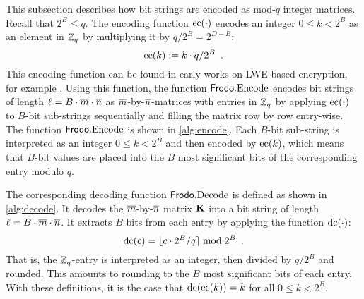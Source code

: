 This subsection describes how bit strings are encoded as mod-$q$ integer matrices.
Recall that $2^B \leq q$. The encoding function $\textrm{\upshape\mdseries ec}(\cdot)$ encodes an integer $0 \leq k < 2^B$ as an element in $\mathbb{Z}_q$ by multiplying it by $q/2^B=2^{D-B}$:
\[ \textrm{\upshape\mdseries ec}(k) := k\cdot  q/2^B \enspace . \]
This encoding function can be found in early works on LWE-based encryption, for example \cite{PKC:KawTanXag07,STOC:PeiWat08,C:PeiVaiWat08}.
Using this function, the function $\textsf{\upshape\mdseries Frodo}.\textrm{\upshape\mdseries Encode}$ encodes bit strings of
length $\ell=B\cdot \overline{m}\cdot\overline{n}$ as  $\overline{m}$-by-$\overline{n}$-matrices with
entries in $\mathbb{Z}_q$ by applying $\textrm{\upshape\mdseries ec}(\cdot)$ to $B$-bit sub-strings sequentially and filling the matrix row by row entry-wise. The function $\textsf{\upshape\mdseries Frodo}.\textrm{\upshape\mdseries Encode}$ is shown in \autoref{alg:encode}.
Each $B$-bit sub-string is interpreted as an integer $0 \leq k < 2^B$ and then encoded by $\textrm{\upshape\mdseries ec}(k)$, which means that $B$-bit values are placed into the $B$ most significant bits of the corresponding entry modulo $q$.  

The corresponding decoding function $\textsf{\upshape\mdseries Frodo}.\textrm{\upshape\mdseries Decode}$ is defined as shown in
\autoref{alg:decode}. It decodes the $\overline{m}$-by-$\overline{n}$ matrix $\mathbf{K}$ into a
bit string of length $\ell=B\cdot\overline{m}\cdot\overline{n}$. It extracts $B$ bits from
each entry by applying the function $\textrm{\upshape\mdseries dc}(\cdot)$:
\[ \textrm{\upshape\mdseries dc}(c) = \lfloor c \cdot 2^B/q\rceil \bmod 2^B \enspace . \]
That is, the $\mathbb{Z}_{q}$-entry is interpreted as an integer, then
divided by $q/2^B$ and rounded. This amounts to rounding to the $B$
most significant bits of each entry. With these definitions, it is the case that $\textrm{\upshape\mdseries dc}(\textrm{\upshape\mdseries ec}(k)) = k$ for all $0\leq k < 2^B$.

